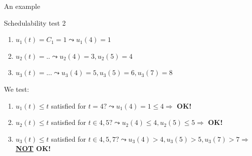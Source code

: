 \documentclass{beamer}
\begin{document}
\begin{frame}{An example}

\begin{block}{Schedulability test 2}
 \begin{enumerate}
  \item $u_1(t) = C_1 = 1 \leadsto u_1(4) = 1 $
   \item $u_2(t) = ..  \leadsto u_2(4) = 3, u_2(5) = 4$
   \item $u_3(t) = ... \leadsto u_3(4) = 5, u_3(5) = 6, u_3(7) = 8$
     \end{enumerate}
We test:
\begin{enumerate}

  \item $u_1(t) \leq t$ satisfied for $t=4? \leadsto u_1(4) = 1 \leq 4 \Rightarrow$ \textbf{OK!}

  
  \item $u_2(t) \leq t$ satisfied for $t\in{4,5}? \leadsto u_2(4) \leq 4,  u_2(5) \leq 5 \Rightarrow$ \textbf{OK!}
  \item $u_3(t) \leq t$ satisfied for $t\in{4,5,7}? \leadsto u_3(4) > 4,  u_3(5) > 5, u_3(7) > 7 \Rightarrow$ \textbf{\underline{NOT} OK!}
\end{enumerate}


  
  \end{block}
\end{frame}
\end{document}
